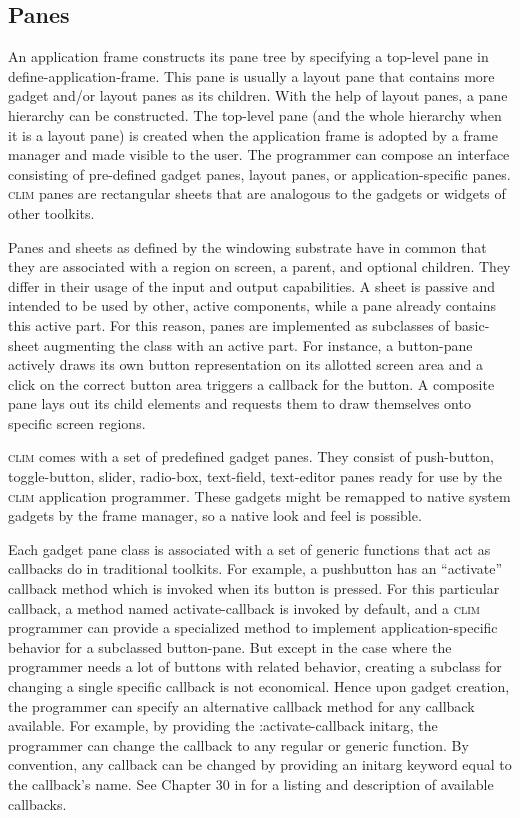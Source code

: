 \documentclass[twocolumn,a4paper]{article}
\newcommand {\code}[1]{{\sffamily #1}}
\newcommand {\CLIM}{\textsc{clim}}
\let\class\code
\let\method\code
\let\macro\code
\let\keyword\code
\begin{document}
\subsection{Panes}

An application frame constructs its pane tree by specifying a
top-level pane in \macro{define-application-frame}. This pane is
usually a layout pane that contains more gadget and/or layout panes as
its children. With the help of layout panes, a pane hierarchy can be
constructed. The top-level pane (and the whole hierarchy when it is a
layout pane) is created when the application frame is adopted by a
frame manager and made visible to the user. The programmer can compose
an interface consisting of pre-defined gadget panes, layout panes, or
application-specific panes. \CLIM{} panes are rectangular sheets that
are analogous to the gadgets or widgets of other toolkits.

Panes and sheets as defined by the windowing substrate have in common
that they are associated with a region on screen, a parent, and
optional children. They differ in their usage of the input and output
capabilities. A sheet is passive and intended to be used by other,
active components, 
while a pane already contains this active part. 
For this reason,
panes are implemented as subclasses of \class{basic-sheet}
augmenting the class with an active part. For instance, a button-pane
actively draws its own button representation on its allotted screen
area and a click on the correct button area triggers a callback for
the button. A composite pane lays out its child elements and
requests them to draw themselves onto specific screen regions.

\CLIM{} comes with a set of predefined gadget panes. They consist of
push-button, toggle-button, slider, radio-box, text-field, text-editor
panes ready for use by the \CLIM{} application programmer. These
gadgets might be remapped to native system gadgets by the frame
manager, so a native look and feel is possible.

Each gadget pane class is associated with a set of generic functions
that act as callbacks do in traditional toolkits. For example, a pushbutton
has an ``activate'' callback method which is invoked when its button
is pressed. For this particular callback, a method named
\method{activate-callback} is invoked by default, and a \CLIM{}
programmer can provide a specialized method to implement
application-specific behavior for a subclassed button-pane. But except
in the case where the programmer needs a lot of buttons with related
behavior, creating a subclass for changing a single specific callback
is not economical. Hence upon gadget creation, the programmer can
specify an alternative callback method for any callback available. For
example, by
providing the \keyword{:activate-callback} initarg, the programmer can
change the callback to any regular or generic function. By convention,
any callback can be changed by providing an initarg keyword equal to
the callback's name. See Chapter 30 in \cite{clim-spec} for a listing
and description of available callbacks.
\end{document}
